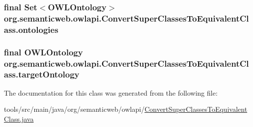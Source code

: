 \hypertarget{classorg_1_1semanticweb_1_1owlapi_1_1_convert_super_classes_to_equivalent_class_aac704c5553f9affc3fc3711b59794b0a}{
\subsubsection[{ontologies}]{\setlength{\rightskip}{0pt plus 5cm}final Set$<${\bf O\-W\-L\-Ontology}$>$ org.\-semanticweb.\-owlapi.\-Convert\-Super\-Classes\-To\-Equivalent\-Class.\-ontologies\hspace{0.3cm}{\ttfamily [private]}}}\label{classorg_1_1semanticweb_1_1owlapi_1_1_convert_super_classes_to_equivalent_class_aac704c5553f9affc3fc3711b59794b0a}
\hypertarget{classorg_1_1semanticweb_1_1owlapi_1_1_convert_super_classes_to_equivalent_class_a2f4bbe3d725d7857c6f52cace2e1ef29}{
\subsubsection[{target\-Ontology}]{\setlength{\rightskip}{0pt plus 5cm}final {\bf O\-W\-L\-Ontology} org.\-semanticweb.\-owlapi.\-Convert\-Super\-Classes\-To\-Equivalent\-Class.\-target\-Ontology\hspace{0.3cm}{\ttfamily [private]}}}\label{classorg_1_1semanticweb_1_1owlapi_1_1_convert_super_classes_to_equivalent_class_a2f4bbe3d725d7857c6f52cace2e1ef29}


The documentation for this class was generated from the following file\-:\begin{DoxyCompactItemize}
\item 
tools/src/main/java/org/semanticweb/owlapi/\hyperlink{_convert_super_classes_to_equivalent_class_8java}{Convert\-Super\-Classes\-To\-Equivalent\-Class.\-java}\end{DoxyCompactItemize}
